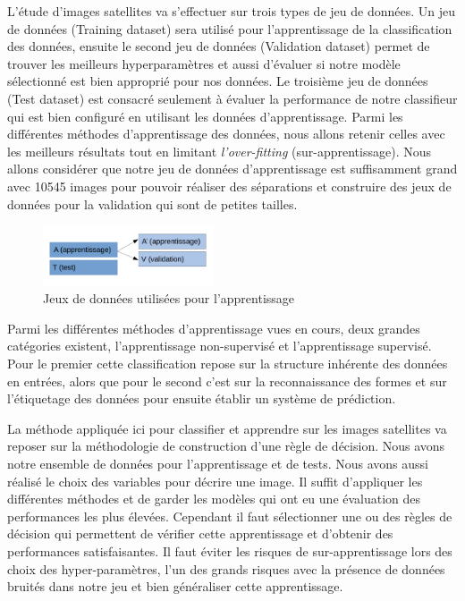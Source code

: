 \documentclass[twocolumn,10pt]{article}
\begin{document}
L'étude d'images satellites va s'effectuer sur trois types de jeu de données. Un jeu de données (Training dataset) sera utilisé pour l'apprentissage de la classification des données, ensuite le second jeu de données (Validation dataset) permet de trouver les meilleurs hyperparamètres et aussi d'évaluer si notre modèle sélectionné est bien approprié pour nos données. Le troisième jeu de données (Test dataset) est consacré seulement à évaluer la performance de notre classifieur qui est bien configuré en utilisant les données d'apprentissage. Parmi les différentes méthodes d'apprentissage des données, nous allons retenir celles avec les meilleurs résultats tout en limitant \textit{l'over-fitting} (sur-apprentissage). Nous allons considérer que notre jeu de données d'apprentissage est suffisamment grand avec 10545 images pour pouvoir réaliser des séparations et construire des jeux de données pour la validation qui sont de petites tailles. 

\begin{figure}[htbp]
\begin{center}
\includegraphics[width=0.45\textwidth]{figures/jeu_de_donnees.png}
\caption{\label{fig:jeu_de_données}Jeux de données utilisées pour l'apprentissage}
\end{center}
\end{figure}

Parmi les différentes méthodes d'apprentissage vues en cours, deux grandes catégories existent, l'apprentissage non-supervisé et l'apprentissage supervisé. Pour le premier cette classification repose sur la structure inhérente des données en entrées, alors que pour le second c'est sur la reconnaissance des formes et sur l'étiquetage des données pour ensuite établir un système de prédiction. 

La méthode appliquée ici pour classifier et apprendre sur les images satellites va reposer sur la méthodologie de construction d'une règle de décision. Nous avons notre ensemble de données pour l'apprentissage et de tests. Nous avons aussi réalisé le choix des variables pour décrire une image. Il suffit d'appliquer les différentes méthodes et de garder les modèles qui ont eu une évaluation des performances les plus élevées. Cependant il faut sélectionner une ou des règles de décision qui permettent de vérifier cette apprentissage et d'obtenir des performances satisfaisantes. Il faut éviter les risques de sur-apprentissage lors des choix des hyper-paramètres, l'un des grands risques avec la présence de données bruités dans notre jeu et bien généraliser cette apprentissage. 
\end{document}
